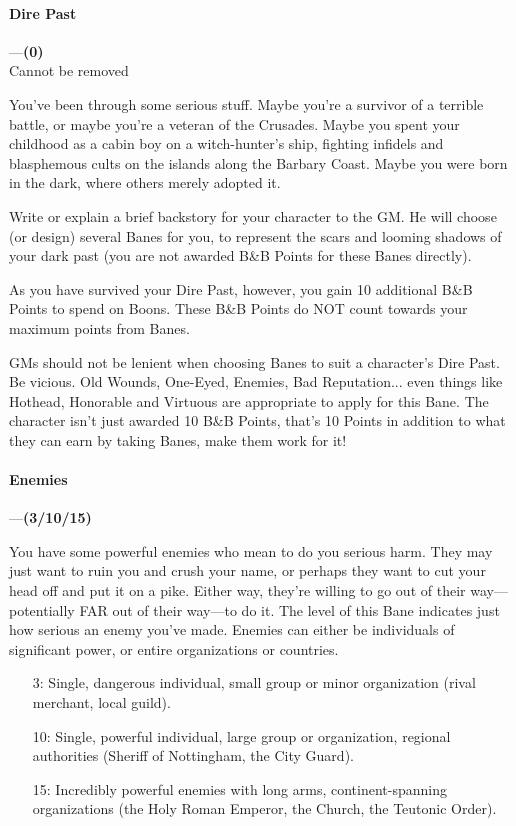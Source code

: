 \documentclass[oneside,11pt,english]{book}
\begin{document}
\paragraph{\label{bane:Dire Past}Dire Past}---\quad\textbf{(0) }\\
{Cannot be removed}\par
You've been through some serious stuff. Maybe you're a survivor of a terrible battle, or maybe you're a veteran of the Crusades. Maybe you spent your childhood as a cabin boy on a witch-hunter's ship, fighting infidels and blasphemous cults on the islands along the Barbary Coast. Maybe you were born in the dark, where others merely adopted it.


Write or explain a brief backstory for your character to the GM. He will choose (or design) several Banes 
for you, to represent the scars and looming shadows of your dark past (you are not awarded B\&B Points 
for these Banes directly).


As you have survived your Dire Past, however, you gain 10 additional B\&B Points to spend on Boons. 
These B\&B Points do NOT count towards your maximum points from Banes. 


GMs should not be lenient when choosing Banes to suit a character’s Dire Past. Be vicious. Old Wounds, 
One-Eyed, Enemies, Bad Reputation... even things like Hothead, Honorable and Virtuous are appropriate 
to apply for this Bane. The character isn’t just awarded 10 B\&B Points, that’s 10 Points in addition to what they can earn by taking Banes, make them work for it! 
\paragraph{\label{bane:Enemies}Enemies}---\quad\textbf{(3/10/15) }\par
You have some powerful enemies who mean to do you serious harm. They may just want to ruin you and 
crush your name, or perhaps they want to cut your head off and put it on a pike. Either way, they're 
willing to go out of their way—potentially FAR out of their way—to do it. The level of this Bane 
indicates just how serious an enemy you've made. Enemies can either be individuals of significant power, or entire organizations or countries. 
\begin{itemize}
	\item [3:] Single, dangerous individual, small group or minor organization (rival merchant, local guild). 
	\item [10:] Single, powerful individual, large group or organization, regional authorities (Sheriff of Nottingham, the City Guard).
	\item [15:] Incredibly powerful enemies with long arms, continent-spanning organizations (the Holy Roman Emperor, the Church, the Teutonic Order).
\end{itemize}
\end{document}
